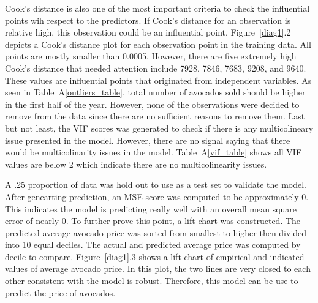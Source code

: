 \documentclass[11pt]{article}\usepackage[]{graphicx}\usepackage[]{color}
\begin{document}
\noindent Cook's distance is also one of the most important criteria to check the influential points wih respect to the predictors. If Cook's distance for an observation is relative high, this observation could be an influential point. Figure~\ref{diag1}.2 depicts a Cook's distance plot for each observation point in the training data. All points are mostly smaller than 0.0005. However, there are five extremely high Cook's distance that needed attention include 7928, 7846, 7683, 9208, and 9640. These values are influential points that originated from independent variables. As seen in Table~A\ref{outliers_table}, total number of avocados sold should be higher in the first half of the year. However, none of the observations were decided to remove from the data since there are no sufficient reasons to remove them. Last but not least, the VIF scores was generated to check if there is any multicolineary issue presented in the model. However, there are no signal saying that there would be multicolinarity issues in the model. Table~A\ref{vif_table} shows all VIF values are below 2 which indicate there are no multicolinearity issues. 
\hfill \break

\noindent A .25 proportion of data was hold out to use as a test set to validate the model. After genearting prediction, an MSE score was computed to be approximately 0. This indicates the model is predicting really well with an overall mean square error of nearly 0. To further prove this point, a lift chart was constructed. The predicted average avocado price was sorted from smallest to higher then divided into 10 equal deciles. The actual and predicted average price was computed by decile to compare. Figure~\ref{diag1}.3 shows a lift chart of empirical and indicated values of average avocado price. In this plot, the two lines are very closed to each other consistent with the model is robust. Therefore, this model can be use to predict the price of avocados.   
\hfill \break
\end{document}
